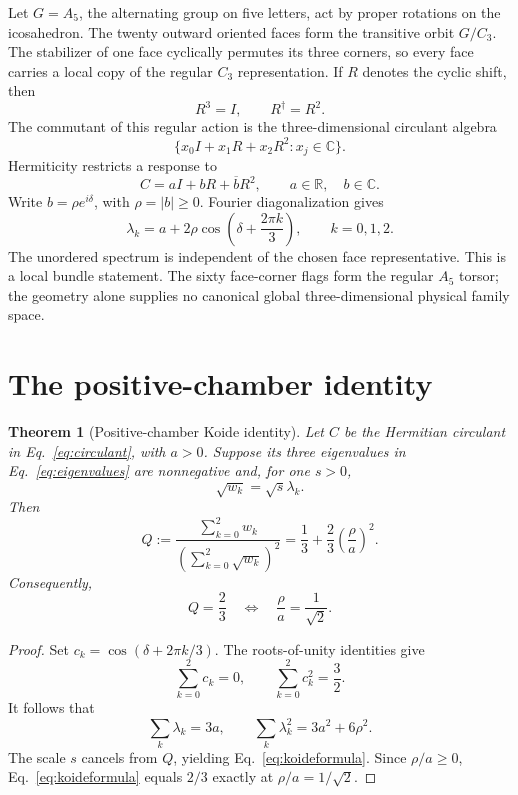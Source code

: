 \documentclass[11pt]{article}
\newtheorem{theorem}{Theorem}
\theoremstyle{remark}
\newcommand{\C}{\mathbb C}
\newcommand{\R}{\mathbb R}
\begin{document}
Let \(G=A_5\), the alternating group on five letters, act by proper rotations
on the icosahedron. The twenty outward
oriented faces form the transitive orbit \(G/C_3\). The stabilizer of one face
cyclically permutes its three corners, so every face carries a local copy of
the regular \(C_3\) representation. If \(R\) denotes the cyclic shift, then
\[
R^3=I,\qquad R^\dagger=R^2.
\]
The commutant of this regular action is the three-dimensional circulant
algebra
\[
\{x_0I+x_1R+x_2R^2:x_j\in\C\}.
\]
Hermiticity restricts a response to
\begin{equation}
C=aI+bR+\overline bR^2,\qquad a\in\R,\quad b\in\C.
\label{eq:circulant}
\end{equation}
Write \(b=\rho e^{i\delta}\), with \(\rho=|b|\geq0\). Fourier
diagonalization gives
\begin{equation}
\lambda_k=a+2\rho\cos\left(\delta+\frac{2\pi k}{3}\right),
\qquad k=0,1,2.
\label{eq:eigenvalues}
\end{equation}
The unordered spectrum is independent of the chosen face representative.
This is a local bundle statement. The sixty face-corner flags form the
regular \(A_5\) torsor; the geometry alone supplies no canonical global
three-dimensional physical family space.

\section{The positive-chamber identity}

\begin{theorem}[Positive-chamber Koide identity]
\label{thm:koide}
Let \(C\) be the Hermitian circulant in
Eq.~\eqref{eq:circulant}, with \(a>0\). Suppose its three eigenvalues in
Eq.~\eqref{eq:eigenvalues} are nonnegative and, for one \(s>0\),
\[
\sqrt{w_k}=\sqrt{s}\lambda_k.
\]
Then
\begin{equation}
Q:=\frac{\sum_{k=0}^2w_k}
{\left(\sum_{k=0}^2\sqrt{w_k}\right)^2}
=\frac13+\frac23\left(\frac{\rho}{a}\right)^2.
\label{eq:koideformula}
\end{equation}
Consequently,
\begin{equation}
Q=\frac23
\quad\Longleftrightarrow\quad
\frac{\rho}{a}=\frac1{\sqrt2}.
\label{eq:balance}
\end{equation}
\end{theorem}

\begin{proof}
Set \(c_k=\cos(\delta+2\pi k/3)\). The roots-of-unity identities give
\[
\sum_{k=0}^2c_k=0,
\qquad
\sum_{k=0}^2c_k^2=\frac32.
\]
It follows that
\[
\sum_k\lambda_k=3a,
\qquad
\sum_k\lambda_k^2=3a^2+6\rho^2.
\]
The scale \(s\) cancels from \(Q\), yielding
Eq.~\eqref{eq:koideformula}. Since \(\rho/a\geq0\),
Eq.~\eqref{eq:koideformula} equals \(2/3\) exactly at
\(\rho/a=1/\sqrt2\).
\end{proof}
\end{document}
